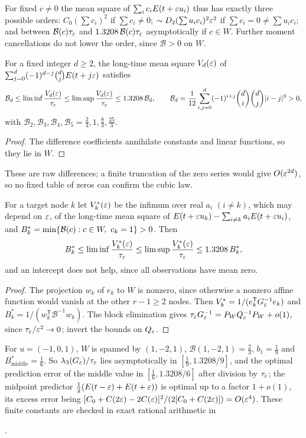 For fixed $c\ne0$ the mean square of $\sum_ic_iE(t+\varepsilon u_i)$ thus has exactly three possible
orders: $C_0(\sum c_i)^2$ if $\sum c_i\ne0$; $\sim D_2(\sum u_ic_i)^2\varepsilon^2$ if $\sum c_i=0\ne\sum u_ic_i$;
and between $\mathcal B(c)\tau_\varepsilon$ and $1.3208\,\mathcal B(c)\tau_\varepsilon$ asymptotically if $c\in W$. Further
moment cancellations do not lower the order, since $\mathcal B>0$ on $W$.

\begin{corollary}\label{zer:cor:rawdiff}
For a fixed integer $d\ge2$, the long-time mean square $V_d(\varepsilon)$ of
$\sum_{j=0}^d(-1)^{d-j}\binom djE(t+j\varepsilon)$ satisfies
\[
 \mathcal B_d\le\liminf\frac{V_d(\varepsilon)}{\tau_\varepsilon}\le\limsup\frac{V_d(\varepsilon)}{\tau_\varepsilon}\le1.3208\,\mathcal B_d,\qquad
 \mathcal B_d=\frac1{12}\sum_{i,j=0}^d(-1)^{i+j}\binom di\binom dj\lvert i-j\rvert^3>0,
\]
with $\mathcal B_2,\mathcal B_3,\mathcal B_4,\mathcal B_5=\tfrac23,1,\tfrac83,\tfrac{25}3$.
\end{corollary}
\begin{proof}
The difference coefficients annihilate constants and linear functions, so they lie in $W$.
\end{proof}

These are raw differences; a finite truncation of the zero series would give $O(\varepsilon^{2d})$, so
no fixed table of zeros can confirm the cubic law.

\begin{theorem}\label{zer:thm:predict}
For a target node $k$ let $V_k^*(\varepsilon)$ be the infimum over real $a_i$ $(i\ne k)$, which may depend
on $\varepsilon$, of the long-time mean square of $E(t+\varepsilon u_k)-\sum_{i\ne k}a_iE(t+\varepsilon u_i)$, and
$B_k^*=\min\set{\mathcal B(c):c\in W,\ c_k=1}>0$. Then
\[
 B_k^*\le\liminf\frac{V_k^*(\varepsilon)}{\tau_\varepsilon}\le\limsup\frac{V_k^*(\varepsilon)}{\tau_\varepsilon}\le1.3208\,B_k^*,
\]
and an intercept does not help, since all observations have mean zero.
\end{theorem}
\begin{proof}
The projection $w_k$ of $e_k$ to $W$ is nonzero, since otherwise a nonzero affine function would
vanish at the other $r-1\ge2$ nodes. Then $V_k^*=1/(e_k^{\mathsf T}G_\varepsilon^{-1}e_k)$ and
$B_k^*=1/(w_k^{\mathsf T}\mathcal B^{-1}w_k)$. The block elimination gives
$\tau_\varepsilon G_\varepsilon^{-1}=P_WQ_\varepsilon^{-1}P_W+o(1)$, since $\tau_\varepsilon/\varepsilon^2\to0$; invert the bounds on $Q_\varepsilon$.
\end{proof}

For $u=(-1,0,1)$, $W$ is spanned by $(1,-2,1)$, $\mathcal B(1,-2,1)=\tfrac23$, $b_1=\tfrac19$ and
$B^*_{\mathrm{middle}}=\tfrac16$. So $\lambda_3(G_\varepsilon)/\tau_\varepsilon$ lies asymptotically in
$[\tfrac19,1.3208/9]$, and the optimal prediction error of the middle value in
$[\tfrac16,1.3208/6]$ after division by $\tau_\varepsilon$; the midpoint predictor $\tfrac12(E(t-\varepsilon)+E(t+\varepsilon))$
is optimal up to a factor $1+o(1)$, its excess error being
$[C_0+C(2\varepsilon)-2C(\varepsilon)]^2/(2[C_0+C(2\varepsilon)])=O(\varepsilon^4)$. These finite constants are checked in exact
rational arithmetic in
\begin{center}.\end{center}

